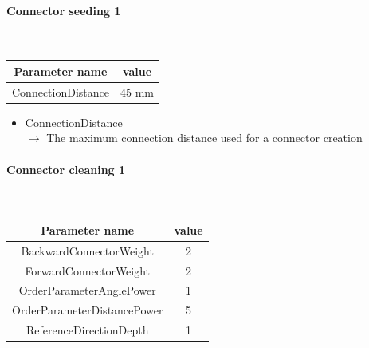 \documentclass[cits]{JINST}
\begin{document}
\paragraph{Connector seeding 1} ~

\begin{table}[!ht]
  \begin{center}
    \begin{tabu} to \linewidth { c | c } 
          Parameter name & value \\
          \hline
          ConnectionDistance & 45 mm
    \end{tabu} 
  \end{center}
\end{table}

\begin{itemize}
  \item ConnectionDistance \\
  $\rightarrow$ The maximum connection distance used for a connector creation
\end{itemize}


\newpage
\paragraph{Connector cleaning 1} ~

\begin{table}[!ht]
  \begin{center}
    \begin{tabu} to \linewidth { c | c } 
          Parameter name & value \\
          \hline
          BackwardConnectorWeight & 2 \\
          ForwardConnectorWeight & 2 \\
          OrderParameterAnglePower & 1 \\
          OrderParameterDistancePower & 5 \\
          ReferenceDirectionDepth & 1
    \end{tabu} 
  \end{center}
\end{table}
\end{document}
